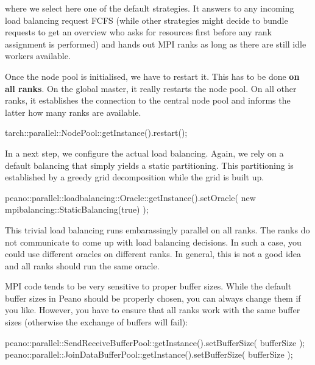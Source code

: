 \noindent
where we select here one of the default strategies. 
It answers to any incoming load balancing request FCFS (while other strategies
might decide to bundle requests to get an overview who asks for resources first
before any rank assignment is performed) and hands out MPI ranks as long as
there are still idle workers available.

Once the node pool is initialised, we have to restart it. 
This has to be done {\bf on all ranks}. 
On the global master, it really restarts the node pool.
On all other ranks, it establishes the connection to the central node pool
and informs the latter how many ranks are available.

\begin{code}
  tarch::parallel::NodePool::getInstance().restart();
\end{code}

\noindent
In a next step, we configure the actual load balancing. 
Again, we rely on a default balancing that simply yields a static partitioning. 
This partitioning is established by a greedy grid decomposition while the grid
is built up.

\begin{code}
  peano::parallel::loadbalancing::Oracle::getInstance().setOracle(
    new mpibalancing::StaticBalancing(true)
  );
\end{code}

\noindent
This trivial load balancing runs embarassingly parallel on all ranks. 
The ranks do not communicate to come up with load balancing decisions.
In such a case, you could use different oracles on different ranks. 
In general, this is not a good idea and all ranks should run the same oracle.
 
 
MPI code tends to be very sensitive to proper buffer sizes.
While the default buffer sizes in Peano should be properly chosen, you can
always change them if you like.
However, you have to ensure that all ranks work with the same buffer sizes
(otherwise the exchange of buffers will fail):

\begin{code}
peano::parallel::SendReceiveBufferPool::getInstance().setBufferSize( bufferSize );
peano::parallel::JoinDataBufferPool::getInstance().setBufferSize( bufferSize );
\end{code}


